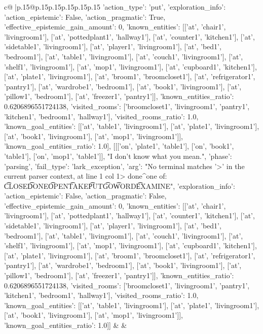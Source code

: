 \documentclass{article}
\begin{document}
{\begin{supertabular}{c@{$\;$}|p{.15\linewidth}@{}p{.15\linewidth}p{.15\linewidth}p{.15\linewidth}p{.15\linewidth}p{.15\linewidth}}
{{{{'action_type': 'put', 'exploration_info': {'action_epistemic': False, 'action_pragmatic': True, 'effective_epistemic_gain_amount': 0, 'known_entities': [['at', 'chair1', 'livingroom1'], ['at', 'pottedplant1', 'hallway1'], ['at', 'counter1', 'kitchen1'], ['at', 'sidetable1', 'livingroom1'], ['at', 'player1', 'livingroom1'], ['at', 'bed1', 'bedroom1'], ['at', 'table1', 'livingroom1'], ['at', 'couch1', 'livingroom1'], ['at', 'shelf1', 'livingroom1'], ['at', 'mop1', 'livingroom1'], ['at', 'cupboard1', 'kitchen1'], ['at', 'plate1', 'livingroom1'], ['at', 'broom1', 'broomcloset1'], ['at', 'refrigerator1', 'pantry1'], ['at', 'wardrobe1', 'bedroom1'], ['at', 'book1', 'livingroom1'], ['at', 'pillow1', 'bedroom1'], ['at', 'freezer1', 'pantry1']], 'known_entities_ratio': 0.6206896551724138, 'visited_rooms': ['broomcloset1', 'livingroom1', 'pantry1', 'kitchen1', 'bedroom1', 'hallway1'], 'visited_rooms_ratio': 1.0, 'known_goal_entities': [['at', 'table1', 'livingroom1'], ['at', 'plate1', 'livingroom1'], ['at', 'book1', 'livingroom1'], ['at', 'mop1', 'livingroom1']], 'known_goal_entities_ratio': 1.0}}], [[['on', 'plate1', 'table1'], ['on', 'book1', 'table1'], ['on', 'mop1', 'table1']], "I don't know what you mean.", {'phase': 'parsing', 'fail_type': 'lark_exception', 'arg': "No terminal matches '>' in the current parser context, at line 1 col 1\n\n> done\n^\nExpected one of: \n\t* CLOSE\n\t* DONE\n\t* OPEN\n\t* TAKE\n\t* PUT\n\t* GO\n\t* WORD\n\t* EXAMINE\n", 'exploration_info': {'action_epistemic': False, 'action_pragmatic': False, 'effective_epistemic_gain_amount': 0, 'known_entities': [['at', 'chair1', 'livingroom1'], ['at', 'pottedplant1', 'hallway1'], ['at', 'counter1', 'kitchen1'], ['at', 'sidetable1', 'livingroom1'], ['at', 'player1', 'livingroom1'], ['at', 'bed1', 'bedroom1'], ['at', 'table1', 'livingroom1'], ['at', 'couch1', 'livingroom1'], ['at', 'shelf1', 'livingroom1'], ['at', 'mop1', 'livingroom1'], ['at', 'cupboard1', 'kitchen1'], ['at', 'plate1', 'livingroom1'], ['at', 'broom1', 'broomcloset1'], ['at', 'refrigerator1', 'pantry1'], ['at', 'wardrobe1', 'bedroom1'], ['at', 'book1', 'livingroom1'], ['at', 'pillow1', 'bedroom1'], ['at', 'freezer1', 'pantry1']], 'known_entities_ratio': 0.6206896551724138, 'visited_rooms': ['broomcloset1', 'livingroom1', 'pantry1', 'kitchen1', 'bedroom1', 'hallway1'], 'visited_rooms_ratio': 1.0, 'known_goal_entities': [['at', 'table1', 'livingroom1'], ['at', 'plate1', 'livingroom1'], ['at', 'book1', 'livingroom1'], ['at', 'mop1', 'livingroom1']], 'known_goal_entities_ratio': 1.0}}]] 
	  } 
	   } 
	   } 
	 & & \\ 
 


\end{supertabular}}
\end{document}
